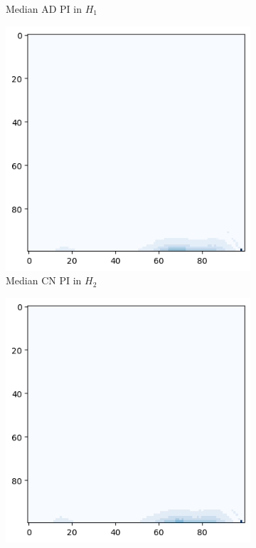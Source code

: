 \documentclass{article}
\begin{document}
\begin{figure}
\begin{subfigure}{0.32\textwidth}
    \caption{Median AD PI in $H_1 $}
  \end{subfigure}
  \begin{subfigure}{0.32\textwidth}
    \includegraphics[width=\textwidth]{figures/median_pls/median_pi_CN_h_2.png}
    \caption{Median CN PI in $H_2$}
  \end{subfigure}
  \begin{subfigure}{0.32\textwidth}
    \includegraphics[width=\textwidth]{figures/median_pls/median_pi_MCI_h_2.png}

\end{subfigure}
\end{figure}
\end{document}
